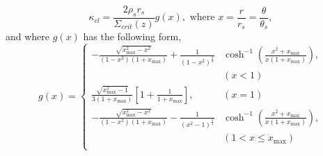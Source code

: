 \documentclass[prd, superscriptaddress, tightenlines, longbibliography, nofootinbib, eqsecnum, amsfonts, amsmath, floatfix, twocolumn, notitlepage]{revtex4-2}
\begin{document}
\begin{equation}
    \kappa_{cl} = \frac{2\rho_s r_s}{\Sigma_{crit}(z)}g(x), \text{ where } x=\frac{r}{r_s} = \frac{\theta}{\theta_s},
\end{equation}
and where $g(x)$ has the following form,
\begin{equation}
    g(x) = 
     \begin{cases}
       -\frac{\sqrt{x_{\text{max}}^2-x^2}}{(1-x^2)(1+x_{\text{max}})} + \frac{1}{(1-x^2)^{\frac{3}{2}}}&\cosh^{-1}\left(\frac{x^2+x_{\text{max}}}{x(1+x_{\text{max}})}\right),  \\ &(x < 1)\\
       \frac{\sqrt{x_{\text{max}}^2 - 1}}{3(1+x_{\text{max}})}\left[ 1+\frac{1}{1+x_{\text{max}}} \right],  &(x = 1)\\
       -\frac{\sqrt{x_{\text{max}}^2-x^2}}{(1-x^2)(1+x_{\text{max}})} - \frac{1}{(x^2-1)^{\frac{3}{2}}}&\cosh^{-1}\left(\frac{x^2+x_{\text{max}}}{x(1+x_{\text{max}})}\right),  \\
       &(1< x \leq x_{\text{max}})\\
     \end{cases}
\end{equation}
\end{document}
